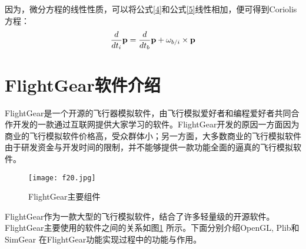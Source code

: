因为，微分方程的线性性质，可以将公式\ref{4}和公式\ref{5}线性相加，便可得到Coriolis方程：
\begin{equation}
\frac{d}{{d{t_i}}}{\bf{p}} = \frac{d}{{d{t_b}}}{\bf{p}} + {\omega _{b/i}} \times {\bf{p}}
\end{equation}
\section{FlightGear软件介绍}
FlightGear是一个开源的飞行器模拟软件，由飞行模拟爱好者和编程爱好者共同合作开发的一款通过互联网提供大家学习的软件。FlightGear开发的原因一方面因为商业的飞行模拟软件价格高，受众群体小；另一方面，大多数商业的飞行模拟软件由于研发资金与开发时间的限制，并不能够提供一款功能全面的逼真的飞行模拟软件。

\begin{figure}[!ht]
\centering
\texttt{[image: f20.jpg]}
\caption{FlightGear主要组件}
\label{fig10}
\end{figure}
FlightGear作为一款大型的飞行模拟软件，结合了许多轻量级的开源软件。FlightGear主要使用的软件之间的关系如图\ref{fig10} 所示。下面分别介绍OpenGL, Plib和SimGear 在FlightGear功能实现过程中的功能与作用。
